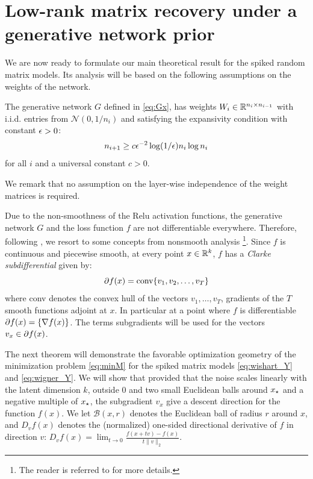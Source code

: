\section{Low-rank matrix recovery under a generative network prior}\label{sec:SpikedRes}
We are now ready to formulate our main theoretical result
for the spiked random matrix models. Its analysis will be based on
the following assumptions on the weights of the network.

\begin{assumption}\label{hyp:randW}
	The generative network $G$ defined in \eqref{eq:Gx}, has weights $W_i \in \mathbb{R}^{n_i \times n_{i-1}}$ with i.i.d. entries from $\mathcal{N}(0,1/n_i)$ and satisfying the expansivity  condition with constant $\epsilon >0$:
	\begin{equation*}
	n_{i+1} \geq c \epsilon^{-2} \log(1/\epsilon) n_{i} \log n_{i}
	\end{equation*}
	for all $i$ and a universal constant $c > 0$.
\end{assumption}

We remark that no assumption on the layer-wise independence of the weight matrices is required.

Due to the non-smoothness of the Relu activation functions, the generative network $G$ and the loss function $f$ are not differentiable everywhere. Therefore, following \cite{HHHV18}, we resort to some concepts from nonsmooth analysis \footnote{The reader is referred to \cite{clason2017nonsmooth} for more details.}. Since $f$ is continuous and piecewise smooth, at every point $x \in \mathbb{R}^k$,  $f$  has a \textit{Clarke subdifferential} given by:
\begin{equation}\label{eq:subdiff}
\partial f(x) = \text{conv} \{ v_1, v_2, \dots, v_T \}
\end{equation}
where conv denotes the convex hull of the vectors $v_1, \dots, v_T$, gradients of the $T$ smooth functions adjoint at $x$.  
In particular at a point where $f$ is differentiable $\partial f(x) = \{\nabla f(x) \}$. The terms subgradients will be used for the vectors $v_x \in \partial f(x)$.  

The next theorem will demonstrate the favorable optimization geometry of the minimization problem \eqref{eq:minM} for the spiked matrix models \eqref{eq:wishart_Y} and \eqref{eq:wigner_Y}. 
We will show that provided that the noise scales linearly with the latent dimension $k$, outside 0 and two small Euclidean balls around ${x_{\star}}$ and a negative multiple of ${x_{\star}}$, 
the subgradient $v_x$ give a descent direction
for the function $f(x)$. We let 
$\mathcal{B}(x,r)$ denotes
the Euclidean ball of radius $r$ around $x$, and $D_v f(x)$ denotes the (normalized) one-sided directional derivative of $f$ in direction $v$: $D_{v} f(x) = \lim_{t \to 0} \frac{f(x + t v) - f(x)}{t \|v\|_2}$.

